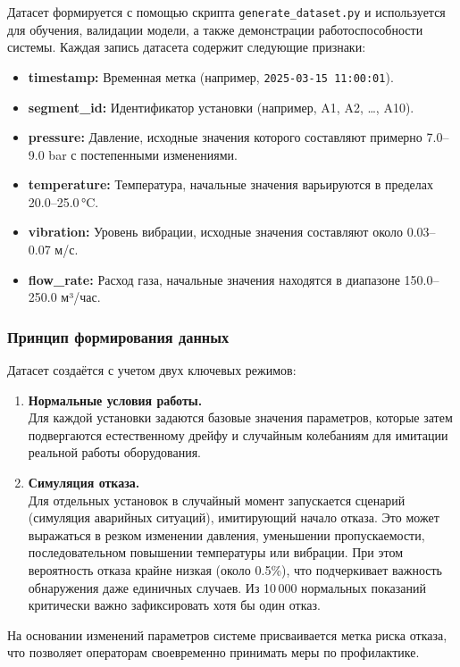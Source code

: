 \documentclass[a4paper,12pt]{article}
\begin{document}
\begin{flushleft}
Датасет формируется с помощью скрипта \texttt{generate\_dataset.py} и используется для обучения, валидации модели, а также демонстрации работоспособности системы. Каждая запись датасета содержит следующие признаки:
\begin{itemize}
    \item \textbf{timestamp:} Временная метка (например, \texttt{2025-03-15 11:00:01}).
    \item \textbf{segment\_id:} Идентификатор установки (например, A1, A2, \dots, A10).
    \item \textbf{pressure:} Давление, исходные значения которого составляют примерно 7.0--9.0 bar с постепенными изменениями.
    \item \textbf{temperature:} Температура, начальные значения варьируются в пределах 20.0--25.0\,°C.
    \item \textbf{vibration:} Уровень вибрации, исходные значения составляют около 0.03--0.07 м/с.
    \item \textbf{flow\_rate:} Расход газа, начальные значения находятся в диапазоне 150.0--250.0 м³/час.
\end{itemize}

\subsubsection{Принцип формирования данных}

Датасет создаётся с учетом двух ключевых режимов:
\begin{enumerate}
    \item \textbf{Нормальные условия работы.} \\
    Для каждой установки задаются базовые значения параметров, которые затем подвергаются естественному дрейфу и случайным колебаниям для имитации реальной работы оборудования.

    \item \textbf{Симуляция отказа.} \\
    Для отдельных установок в случайный момент запускается сценарий (симуляция аварийных ситуаций), имитирующий начало отказа. Это может выражаться в резком изменении давления, уменьшении пропускаемости, последовательном повышении температуры или вибрации. При этом вероятность отказа крайне низкая (около 0.5\%), что подчеркивает важность обнаружения даже единичных случаев. Из 10\,000 нормальных показаний критически важно зафиксировать хотя бы один отказ.
\end{enumerate}

\noindent На основании изменений параметров системе присваивается метка риска отказа, что позволяет операторам своевременно принимать меры по профилактике.



\end{flushleft}
\end{document}
